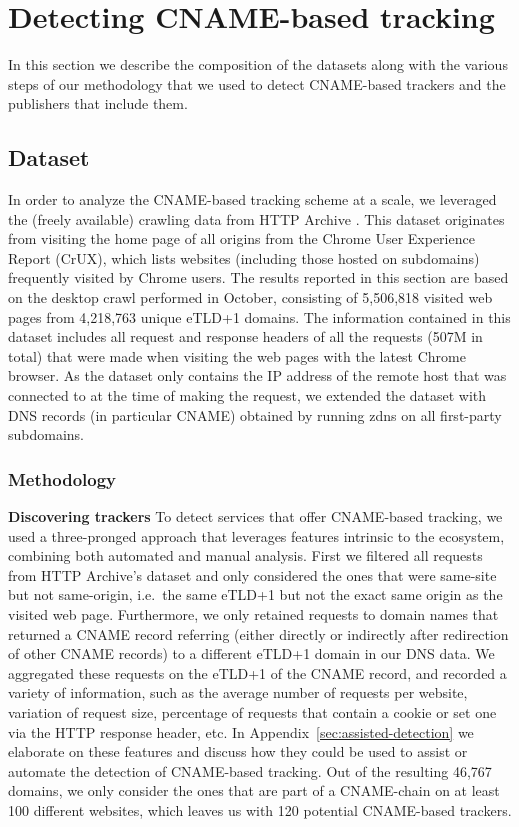 \section{Detecting CNAME-based tracking}
\label{sec:cname-tracking}

In this section we describe the composition of the datasets along with the various steps of our methodology that we used to detect CNAME-based trackers and the publishers that include them.

\subsection{Dataset}
In order to analyze the CNAME-based tracking scheme at a scale, we leveraged the (freely available) crawling data from HTTP Archive \cite{http_archive}.
This dataset originates from visiting the home page of all origins from the Chrome User Experience Report (CrUX), which lists websites (including those hosted on subdomains) frequently visited by Chrome users.
The results reported in this section are based on the desktop crawl performed in October, consisting of 5,506,818 visited web pages from 4,218,763 unique eTLD+1 domains.
The information contained in this dataset includes all request and response headers of all the requests (507M in total) that were made when visiting the web pages with the latest Chrome browser.
As the dataset only contains the IP address of the remote host that was connected to at the time of making the request, we extended the dataset with DNS records (in particular CNAME) obtained by running zdns \cite{zdns} on all first-party subdomains.

\subsubsection{Methodology}
\label{sec:detection-methodology}
\noindent \textbf{Discovering trackers}
To detect services that offer CNAME-based tracking, we used a three-pronged approach that leverages features intrinsic to the ecosystem, combining both automated and manual analysis.
First we filtered all requests from HTTP Archive's dataset and only considered the ones that were same-site but not same-origin, i.e.\ the same eTLD+1 but not the exact same origin as the visited web page.
Furthermore, we only retained requests to domain names that returned a CNAME record referring (either directly or indirectly after redirection of other CNAME records) to a different eTLD+1 domain in our DNS data.
We aggregated these requests on the eTLD+1 of the CNAME record, and recorded a variety of information, such as the average number of requests per website, variation of request size, percentage of requests that contain a cookie or set one via the HTTP response header, etc.
In Appendix~\ref{sec:assisted-detection} we elaborate on these features and discuss how they could be used to assist or automate the detection of CNAME-based tracking.
Out of the resulting 46,767 domains, we only consider the ones that are part of a CNAME-chain on at least 100 different websites, which leaves us with 120 potential CNAME-based trackers. 

